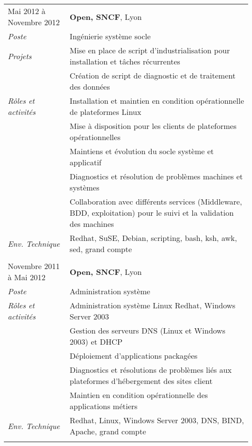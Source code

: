 \documentclass[a4paper,8pt]{article}
\begin{document}
\begin{tabular}{P{3.5cm}|p{13cm}}
Mai 2012 à Novembre 2012	& \textbf{Open, SNCF}, Lyon\\
\textsl{Poste}				& Ingénierie système socle\\
\textsl{Projets}			& Mise en place de script d'industrialisation pour installation et tâches récurrentes\\
							& Création de script de diagnostic et de traitement des données\\
\textsl{Rôles et activités}	& Installation et maintien en condition opérationnelle de plateformes Linux\\
							& Mise à disposition pour les clients de plateformes opérationnelles\\
							& Maintiens et évolution du socle système et applicatif\\
							& Diagnostics et résolution de problèmes machines et systèmes\\
							& Collaboration avec différents services (Middleware, BDD, exploitation) pour le suivi et la validation des machines\\
\textsl{Env. Technique}		& Redhat, SuSE, Debian, scripting, bash, ksh, awk, sed, grand compte\\
 & \\

Novembre 2011 à Mai 2012	& \textbf{Open, SNCF}, Lyon\\
\textsl{Poste}				& Administration système\\
\textsl{Rôles et activités} & Administration système Linux Redhat, Windows Server 2003\\
							& Gestion des serveurs DNS (Linux et Windows 2003) et DHCP\\
							& Déploiement d'applications packagées\\
							& Diagnostics et résolutions de problèmes liés aux plateformes d'hébergement des sites client\\
							& Maintien en condition opérationnelle des applications métiers\\
\textsl{Env. Technique}		& Redhat, Linux, Windows Server 2003, DNS, BIND, Apache, grand compte\\
 & \\


\end{tabular}
\end{document}
